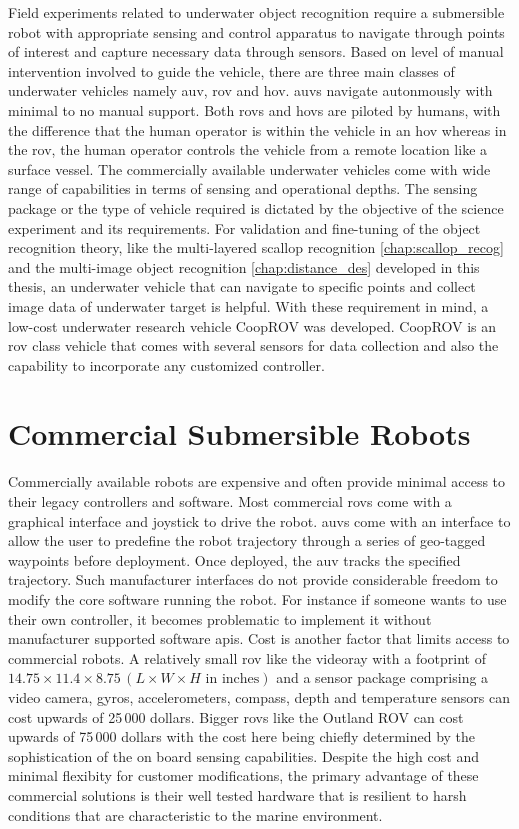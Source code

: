 \documentclass {udthesis}
\begin{document}
Field experiments related to underwater object recognition require a submersible robot with appropriate sensing and control apparatus to navigate through points of interest and capture necessary data through sensors. Based on level of manual intervention involved to guide the vehicle, there are three main classes of underwater vehicles namely \gls{auv}, \gls{rov} and \gls{hov}. \gls{auv}s navigate autonmously with minimal to no manual support. Both \gls{rov}s and \gls{hov}s are piloted by humans, with the difference that the human operator is within the vehicle in an \gls{hov} whereas in the \gls{rov}, the human operator controls the vehicle from a remote location like a surface vessel. The commercially available underwater vehicles come with wide range of capabilities in terms of sensing and operational depths. The sensing package or the type of vehicle required is dictated by the objective of the science experiment and its requirements. For validation and fine-tuning of the object recognition theory, like 
the multi-layered scallop recognition \ref{chap:scallop_recog} and the multi-image object recognition \ref{chap:distance_des} developed in this thesis, an underwater vehicle that can navigate to specific points and collect image data of underwater target is helpful. With these requirement in mind, a low-cost underwater research vehicle CoopROV was developed. CoopROV is an \gls{rov} class vehicle that comes with several sensors for data collection and also the capability to incorporate any customized controller.

\section{Commercial Submersible Robots}

Commercially available robots are expensive and often provide minimal access to their legacy controllers and software. Most commercial \gls{rov}s come with a graphical interface and joystick to drive the robot. \gls{auv}s come with an interface to allow the user to predefine the robot trajectory through a series of geo-tagged waypoints before deployment. Once deployed, the \gls{auv} tracks the specified trajectory. Such manufacturer interfaces do not provide considerable freedom to modify the core software running the robot. For instance if someone wants to use their own controller, it becomes problematic to implement it without manufacturer supported software \gls{api}s. Cost is another factor that limits access to commercial robots. A relatively small \gls{rov} like the videoray \cite{videoray} with a footprint of $14.75\times 11.4\times 8.75 \,(L\times W\times H \text{ in inches})$ and a sensor package comprising a video camera, gyros, accelerometers, compass, depth and temperature sensors can cost upwards of 25\,000 dollars. Bigger \gls{rov}s like the Outland ROV\cite{outlandrov} can cost upwards of 75\,000 dollars with the cost here being chiefly determined by the sophistication of the on board sensing capabilities. Despite the high cost and minimal flexibity for customer modifications, the primary advantage of these commercial solutions is their well tested hardware that is resilient to harsh conditions that are characteristic to the marine environment.
\end{document}

